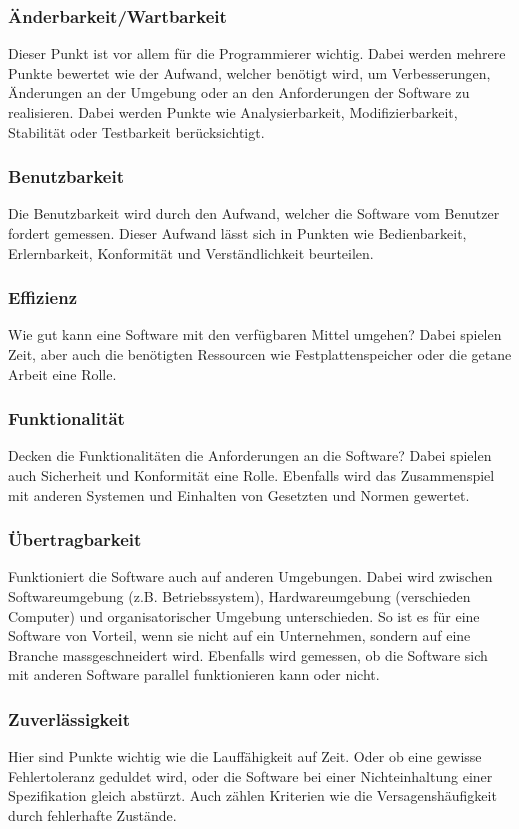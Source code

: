 \subsubsection{Änderbarkeit/Wartbarkeit} 
Dieser Punkt ist vor allem für die Programmierer wichtig. Dabei werden mehrere Punkte bewertet wie der Aufwand, welcher benötigt wird, um Verbesserungen, Änderungen an der Umgebung oder an den Anforderungen der Software zu realisieren. Dabei werden Punkte wie Analysierbarkeit, Modifizierbarkeit, Stabilität oder Testbarkeit berücksichtigt.
\subsubsection{Benutzbarkeit}
Die Benutzbarkeit wird durch den Aufwand, welcher die Software vom Benutzer fordert gemessen. Dieser Aufwand lässt sich in Punkten wie Bedienbarkeit, Erlernbarkeit, Konformität und Verständlichkeit beurteilen.
\subsubsection{Effizienz}
Wie gut kann eine Software mit den verfügbaren Mittel umgehen? Dabei spielen Zeit, aber auch die benötigten Ressourcen wie Festplattenspeicher oder die getane Arbeit eine Rolle.
\subsubsection{Funktionalität} 
Decken die Funktionalitäten die Anforderungen an die Software? Dabei spielen auch Sicherheit und Konformität eine Rolle. Ebenfalls wird das Zusammenspiel mit anderen Systemen und Einhalten von Gesetzten und Normen gewertet.
\subsubsection{Übertragbarkeit} 
Funktioniert die Software auch auf anderen Umgebungen. Dabei wird zwischen Softwareumgebung (z.B. Betriebssystem), Hardwareumgebung (verschieden Computer) und organisatorischer Umgebung unterschieden. So ist es für eine Software von Vorteil, wenn sie nicht auf ein Unternehmen, sondern auf eine Branche massgeschneidert wird. Ebenfalls wird gemessen, ob die Software sich mit anderen Software parallel funktionieren kann oder nicht.
\subsubsection{Zuverlässigkeit} 
Hier sind Punkte wichtig wie die Lauffähigkeit auf Zeit. Oder ob eine gewisse Fehlertoleranz geduldet wird, oder die Software bei einer Nichteinhaltung einer Spezifikation gleich abstürzt. Auch zählen Kriterien wie die Versagenshäufigkeit durch fehlerhafte Zustände.


